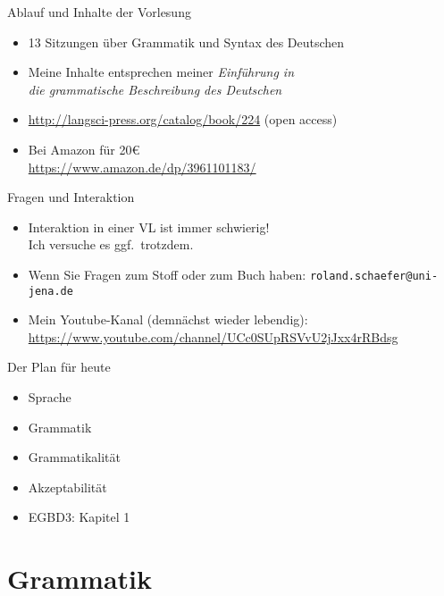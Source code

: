 \begin{frame}
  {Ablauf und Inhalte der Vorlesung}
  \begin{itemize}
    \item 13 Sitzungen über Grammatik und Syntax des Deutschen
    \item Meine Inhalte entsprechen meiner \alert{\textit{Einführung in\\
      die grammatische Beschreibung des Deutschen}} 
    \item \url{http://langsci-press.org/catalog/book/224} (\alert{open access})
      \vspace{\baselineskip}
    \item Bei Amazon für 20€\\
      \url{https://www.amazon.de/dp/3961101183/}
  \end{itemize}
\end{frame}

\begin{frame}
  {Fragen und Interaktion}
  \begin{itemize}
    \item Interaktion in einer VL ist immer schwierig!\\
      Ich versuche es ggf.\ trotzdem.
      \Zeile
    \item Wenn Sie Fragen zum Stoff oder zum Buch haben:
      \texttt{roland.schaefer@uni-jena.de}
      \Zeile
    \item Mein Youtube-Kanal (demnächst wieder lebendig):\\
      \url{https://www.youtube.com/channel/UCc0SUpRSVvU2jJxx4rRBdsg}
  \end{itemize}
\end{frame}

\begin{frame}
  {Der Plan für heute}
  \pause
  \begin{itemize}
    \item Sprache
    \item Grammatik
    \item Grammatikalität
    \item Akzeptabilität
    \Zeile
    \item EGBD3: Kapitel 1
  \end{itemize}
\end{frame}


\section{Grammatik}

